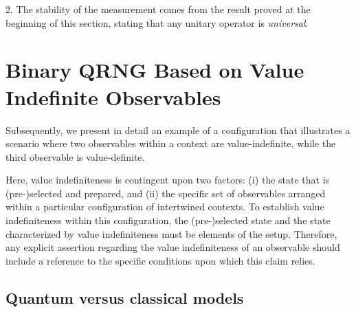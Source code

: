\documentclass[%
 superscriptaddress,
  preprint,
 showpacs,
 showkeys,
 nofootinbib,
  amsmath,amssymb,
 pra,
  longbibliography,
  floatfix,
 ]{revtex4-2}
\theoremstyle{definition}
\begin{document}
2. The stability of the measurement comes from the result proved at the beginning of this section, stating that any unitary operator is {\it universal}.


\section{Binary QRNG Based on Value Indefinite Observables}
\label{2023-viext-qrngdefs}

Subsequently, we present in detail an example of a configuration that illustrates a scenario where two observables within a context are value-indefinite, while the third observable is value-definite.

Here, value indefiniteness is contingent upon two factors:
(i) the state that is (pre-)selected and prepared, and
(ii) the specific set of observables arranged within a particular configuration of intertwined contexts.
To establish value indefiniteness within this configuration, the (pre-)selected state and the state characterized by value indefiniteness must be elements of the setup.
Therefore, any explicit assertion regarding the value indefiniteness of an observable should include a reference to the specific conditions upon which this claim relies.

\subsection{Quantum versus classical models}
\end{document}
